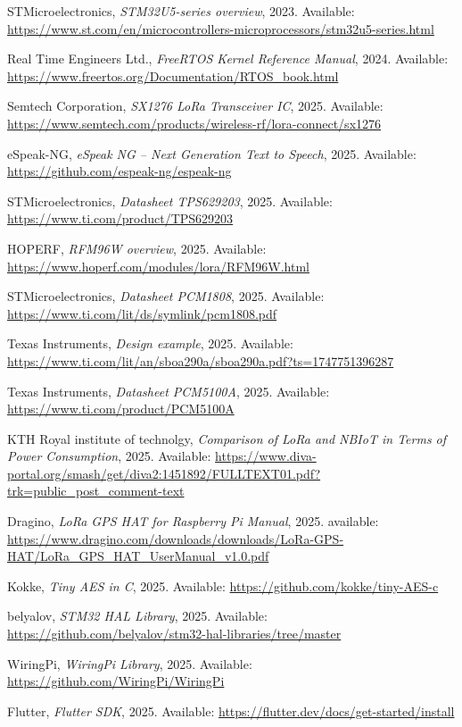 \begin{thebibliography}{1}
STMicroelectronics,
\textit{STM32U5-series overview},
2023.
Available: \url{https://www.st.com/en/microcontrollers-microprocessors/stm32u5-series.html}

Real Time Engineers Ltd.,
\textit{FreeRTOS Kernel Reference Manual},
2024.
Available: \url{https://www.freertos.org/Documentation/RTOS_book.html}

Semtech Corporation,
\textit{SX1276 LoRa Transceiver IC},
2025.
Available: \url{https://www.semtech.com/products/wireless-rf/lora-connect/sx1276}

eSpeak-NG, 
\textit{eSpeak NG -- Next Generation Text to Speech}, 
2025. 
Available: \url{https://github.com/espeak-ng/espeak-ng}

STMicroelectronics,
\textit{Datasheet TPS629203}, 
2025. 
Available: \url{https://www.ti.com/product/TPS629203}

HOPERF,
\textit{RFM96W overview}, 
2025. 
Available: \url{https://www.hoperf.com/modules/lora/RFM96W.html}

STMicroelectronics,
\textit{Datasheet PCM1808}, 
2025. 
Available: \url{https://www.ti.com/lit/ds/symlink/pcm1808.pdf}

Texas Instruments,
\textit{Design example}, 
2025. 
Available: \url{https://www.ti.com/lit/an/sboa290a/sboa290a.pdf?ts=1747751396287}

Texas Instruments,
\textit{Datasheet PCM5100A}, 
2025. 
Available: \url{https://www.ti.com/product/PCM5100A}

KTH Royal institute of technolgy,
\textit{Comparison of LoRa and NBIoT in Terms of Power
Consumption}, 
2025. 
Available: \url{https://www.diva-portal.org/smash/get/diva2:1451892/FULLTEXT01.pdf?trk=public_post_comment-text}

Dragino,
\textit{LoRa GPS HAT for Raspberry Pi Manual},
2025.
available: \url{https://www.dragino.com/downloads/downloads/LoRa-GPS-HAT/LoRa_GPS_HAT_UserManual_v1.0.pdf}

Kokke,
\textit{Tiny AES in C},
2025.
Available: \url{https://github.com/kokke/tiny-AES-c}

belyalov,
\textit{STM32 HAL Library},
2025.
Available: \url{https://github.com/belyalov/stm32-hal-libraries/tree/master}

WiringPi,
\textit{WiringPi Library},
2025.
Available: \url{https://github.com/WiringPi/WiringPi}

Flutter,
\textit{Flutter SDK},
2025.
Available: \url{https://flutter.dev/docs/get-started/install}

\end{thebibliography}
